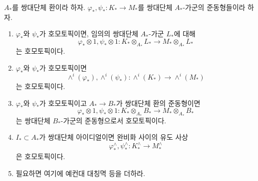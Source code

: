 \begin{lemma}
\label{lemma-homotopy-tensor}
$A_*$를 쌍대단체 환이라 하자.
$\varphi_*, \psi_* : K_* \to M_*$를 쌍대단체 $A_*$-가군의
준동형들이라 하자.
\begin{enumerate}
\item
\label{item-tensor}
$\varphi_*$와 $\psi_*$가 호모토픽이면, 임의의 쌍대단체
$A_*$-가군 $L_*$에 대해
$$
\varphi_* \otimes 1, \psi_* \otimes 1 :
K_* \otimes_{A_*} L_* \longrightarrow M_* \otimes_{A_*} L_*
$$
는 호모토픽이다.
\item
\label{item-wedge}
$\varphi_*$와 $\psi_*$가 호모토픽이면
$$
\wedge^i(\varphi_*), \wedge^i(\psi_*) :
\wedge^i(K_*) \longrightarrow \wedge^i(M_*)
$$
는 호모토픽이다.
\item
\label{item-base-change}
$\varphi_*$와 $\psi_*$가 호모토픽이고 $A_* \to B_*$가 쌍대단체
환의 준동형이면
$$
\varphi_* \otimes 1, \psi_* \otimes 1 :
K_* \otimes_{A_*} B_* \longrightarrow M_* \otimes_{A_*} B_*
$$
는 쌍대단체 $B_*$-가군의 준동형으로서 호모토픽이다.
\item
\label{item-completion}
$I_* \subset A_*$가 쌍대단체 아이디얼이면 완비화 사이의 유도 사상
$$
\varphi^\wedge_*, \psi^\wedge_* :
K_*^\wedge \longrightarrow M_*^\wedge
$$
은 호모토픽이다.
\item 필요하면 여기에 예컨대 대칭멱 등을 더하라.
\end{enumerate}
\end{lemma}

